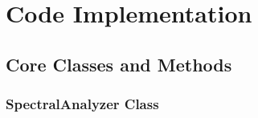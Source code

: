 
\chapter{Code Implementation}

\section{Core Classes and Methods}

\subsection{SpectralAnalyzer Class}

